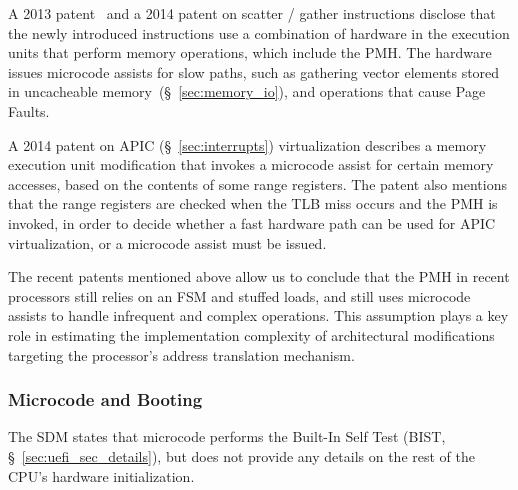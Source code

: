 A 2013 patent~\cite{intel2013scattergather} and a 2014 patent
\cite{intel2014gather} on scatter / gather instructions disclose that the newly
introduced instructions use a combination of hardware in the execution units
that perform memory operations, which include the PMH. The hardware issues
microcode assists for slow paths, such as gathering vector elements stored in
uncacheable memory~(\S~\ref{sec:memory_io}), and operations that cause Page
Faults.


A 2014 patent on APIC (\S~\ref{sec:interrupts}) virtualization
\cite{intel2014vapic} describes a memory execution unit modification that
invokes a microcode assist for certain memory accesses, based on the contents
of some range registers. The patent also mentions that the range registers are
checked when the TLB miss occurs and the PMH is invoked, in order to decide
whether a fast hardware path can be used for APIC virtualization, or a
microcode assist must be issued.

The recent patents mentioned above allow us to conclude that the PMH in recent
processors still relies on an FSM and stuffed loads, and still uses microcode
assists to handle infrequent and complex operations. This assumption plays a
key role in estimating the implementation complexity of architectural
modifications targeting the processor's address translation mechanism.


\subsubsection{Microcode and Booting}
\label{sec:microcode_sec}

The SDM states that microcode performs the Built-In Self Test (BIST,
\S~\ref{sec:uefi_sec_details}), but does not provide any details on the
rest of the CPU's hardware initialization.



